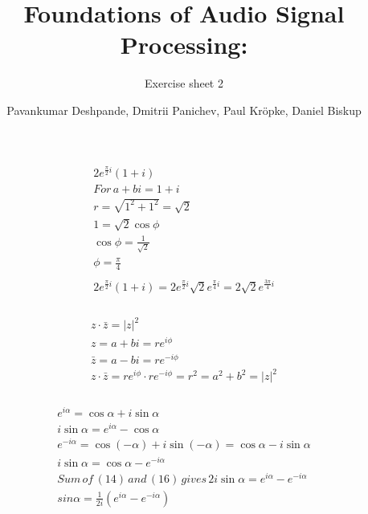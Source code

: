 \documentclass[11pt,a4paper]{scrartcl}
\begin{document}
\author{Pavankumar Deshpande, Dmitrii Panichev, Paul Kröpke, Daniel Biskup}
\title{Foundations of Audio Signal Processing:}
\subtitle{Exercise sheet 2}
\maketitle

\setcounter{section}{2} %
\subsection{} %
\subsubsection{} %
\begin{align}
2e^{\frac{\pi}{2}i}(1 + i)\\
For\,a + bi = 1 + i\\
r=\sqrt{1^2+1^2}=\sqrt{2}\\
1=\sqrt{2} \cos{\phi}\\
\cos{\phi}=\frac{1}{\sqrt{2}}\\
\phi=\frac{\pi}{4}\\
\\
2e^{\frac{\pi}{2}i}(1 + i)=2e^{\frac{\pi}{2}i} \sqrt{2}e^{\frac{\pi}{4}i}=2 \sqrt{2} e^{\frac{3\pi}{4}i}
\end{align}

\subsubsection{} %
\begin{align}
z \cdot \bar{z} = |z|^2\\
z=a + bi=re^{i\phi}\\
\bar{z}=a - bi=re^{-i\phi}\\
z \cdot \bar{z} = re^{i\phi}\cdot re^{-i\phi}=r^2=a^2+b^2=|z|^2
\end{align}

\subsubsection{} %
\begin{align}
e^{i\alpha}=\cos{\alpha}+i \sin{\alpha}\\
i \sin{\alpha}=e^{i \alpha} - \cos{\alpha}\\
e^{-i \alpha}=\cos{(-\alpha)}+i \sin{(-\alpha)}=\cos{\alpha} - i \sin{\alpha}\\
i \sin{\alpha}=\cos{\alpha} - e^{-i \alpha}\\
Sum \, of \,(14) \, and \, (16) \, gives \, 2i \sin{\alpha} = e ^{i \alpha} - e^{-i \alpha}\\
sin{\alpha} = \frac{1}{2i} (e ^{i \alpha} - e^{-i \alpha})
\end{align}
\end{document}
